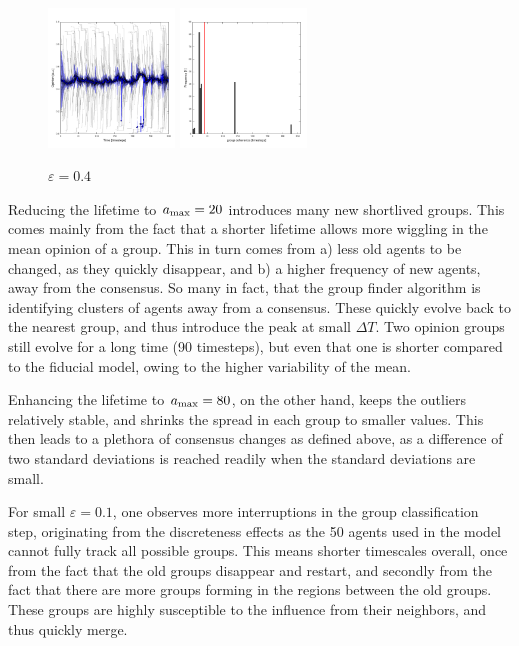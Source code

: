 \documentclass[useAMS,usenatbib]{mn2e}
\begin{document}
\begin{figure}
  \begin{center}
    \includegraphics[width=0.3\textwidth]{fig/evol_04.pdf}
    \includegraphics[width=0.3\textwidth]{fig/var_04.pdf}
  \end{center}
  \caption{\label{fig:04}$\varepsilon=0.4$}
\end{figure}

Reducing the lifetime to $a_{\rm max}=20$ introduces many new
shortlived groups. This comes mainly from the fact that a shorter
lifetime allows more wiggling in the mean opinion of a group. This in
turn comes from a) less old agents to be changed, as they quickly
disappear, and b) a higher frequency of new agents, away from the
consensus. So many in fact, that the group finder algorithm is
identifying clusters of agents away from a consensus. These quickly
evolve back to the nearest group, and thus introduce the peak at small
$\Delta T$. Two opinion groups still evolve for a long time (90
timesteps), but even that one is shorter compared to the fiducial
model, owing to the higher variability of the mean.

Enhancing the lifetime to $a_{\rm max}=80$, on the other hand,
keeps the outliers relatively stable, and shrinks the spread in each
group to smaller values. This then leads to a plethora of consensus
changes as defined above, as a difference of two standard deviations
is reached readily when the standard deviations are small.


For small $\varepsilon=0.1$, one observes more
interruptions in the group classification step, originating from the
discreteness effects as the 50 agents used in the model cannot fully track all possible groups. This means shorter
timescales overall, once from the fact that the old groups disappear
and restart, and secondly from the fact that there are more groups
forming in the regions between the old groups. These groups are highly
susceptible to the influence from their neighbors, and thus quickly
merge.
\end{document}
